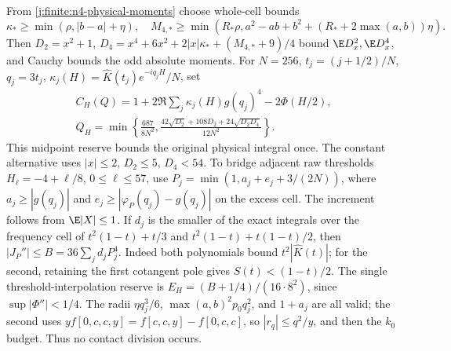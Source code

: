From \eqref{j:finite:n4-physical-moments} choose whole-cell bounds
\[
 \kappa_*\ge\min(\rho,|b-a|+\eta),\quad
 M_{4,*}\ge\min(R_*\rho,a^2-ab+b^2+(R_*+2\max(a,b))\eta).
\]
Then $D_2=x^2+1$, $D_4=x^4+6x^2+2|x|\kappa_*+(M_{4,*}+9)/4$
bound $\E D_x^2,\E D_x^4$, and Cauchy bounds the odd absolute moments.
For $N=256$, $t_j=(j+1/2)/N$, $q_j=3t_j$,
$\kappa_j(H)=\widehat K(t_j)e^{-iq_jH}/N$, set
\begin{gather*}
 C_H(Q)=1+2\Re\sum_j\kappa_j(H)g(q_j)^4-2\Phi(H/2),\\
 Q_H=\min\left\{\frac{687}{8N^2},
 \frac{42\sqrt{D_2}+108D_2+24\sqrt{D_2D_4}}{12N^2}\right\}.
\end{gather*}
This midpoint reserve bounds the original physical integral once.
The constant alternative uses $|x|\le2$, $D_2\le5$, $D_4<54$.
To bridge adjacent raw thresholds $H_\ell=-4+\ell/8$,
$0\le\ell\le57$, use
$P_j=\min(1,a_j+e_j+3/(2N))$, where $a_j\ge|g(q_j)|$ and
$e_j\ge|\varphi_P(q_j)-g(q_j)|$ on the excess cell.
The increment follows from $\E|X|\le1$.
If $d_j$ is the smaller of the exact integrals over the frequency cell of
$t^2(1-t)+t/3$ and $t^2(1-t)+t(1-t)/2$, then
$|J_P''|\le B=36\sum_jd_jP_j^4$.
Indeed both polynomials bound $t^2|\widehat K(t)|$; for the second,
retaining the first cotangent pole gives $S(t)<(1-t)/2$.
The single threshold-interpolation reserve is
$E_H=(B+1/4)/(16\cdot8^2)$, since $\sup|\Phi''|<1/4$.
The radii $\eta q_j^3/6$, $\max(a,b)^2p_0q_j^2$, and $1+a_j$
are all valid; the second uses
$y f[0,c,c,y]=f[c,c,y]-f[0,c,c]$, so $|r_q|\le q^2/y$, and
then the $k_0$ budget. Thus no contact division occurs.

